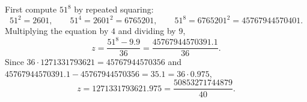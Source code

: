 First compute $51^8$ by repeated squaring:
\[51^2=2601,\qquad 51^4=2601^2=6765201,\qquad 51^8=6765201^2=45767944570401.\]
Multiplying the equation by $4$ and dividing by $9$,
\[z=\dfrac{51^8-9.9}{36}=\dfrac{45767944570391.1}{36}.\]
Since $36\cdot1271331793621=45767944570356$ and $45767944570391.1-45767944570356=35.1=36\cdot0.975$,
\[z=\boxed{1271331793621.975}=\dfrac{50853271744879}{40}.\]
